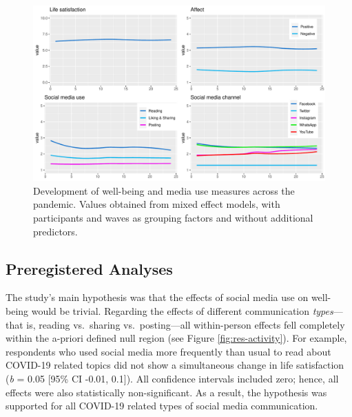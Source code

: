 \documentclass[
  english,
  man,floatsintext]{apa6}
\begin{document}
\begin{figure}
\includegraphics[width=\textwidth]{figures/fig_descriptives} \caption{Development of well-being and media use measures across the pandemic. Values obtained from mixed effect models, with participants and waves as grouping factors and without additional predictors.}\label{fig:fig-desc}
\end{figure}

\hypertarget{preregistered-analyses}{%
\subsection{Preregistered Analyses}\label{preregistered-analyses}}

The study's main hypothesis was that the effects of social media use on well-being would be trivial.
Regarding the effects of different communication \emph{types}---that is, reading vs.~sharing vs.~posting---all within-person effects fell completely within the a-priori defined null region (see Figure \ref{fig:res-activity}).
For example, respondents who used social media more frequently than usual to read about COVID-19 related topics did not show a simultaneous change in life satisfaction (\emph{b} = 0.05 {[}95\% CI -0.01, 0.1{]}).
All confidence intervals included zero; hence, all effects were also statistically non-significant.
As a result, the hypothesis was supported for all COVID-19 related types of social media communication.
\end{document}
